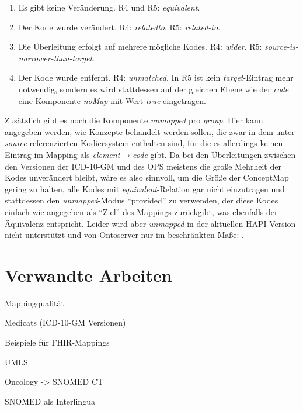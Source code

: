 \begin{enumerate}
\item Es gibt keine Veränderung. R4 und R5: \emph{equivalent}.
\item Der Kode wurde verändert. R4: \emph{relatedto}. R5: \emph{related-to}.
\item Die Überleitung erfolgt auf mehrere mögliche Kodes. R4: \emph{wider}. \newline R5: \emph{source-is-narrower-than-target}.
\item Der Kode wurde entfernt. R4: \emph{unmatched}. \newline In R5 ist kein \emph{target}-Eintrag mehr notwendig, sondern es wird stattdessen auf der gleichen Ebene wie der \emph{code} eine Komponente \emph{noMap} mit Wert \emph{true} eingetragen. 
\end{enumerate}

Zusätzlich gibt es noch die Komponente \emph{unmapped} pro \emph{group}. Hier kann angegeben werden, wie Konzepte behandelt werden sollen, die zwar in dem unter \emph{source} referenzierten Kodiersystem enthalten sind, für die es allerdings keinen Eintrag im Mapping als \emph{element$\rightarrow$code} gibt. Da bei den Überleitungen zwischen den Versionen der ICD-10-GM und des OPS meistens die große Mehrheit der Kodes unverändert bleibt, wäre es also sinnvoll, um die Größe der ConceptMap gering zu halten, alle Kodes mit \emph{equivalent}-Relation gar nicht einzutragen und stattdessen den \emph{unmapped}-Modus "`provided"' zu verwenden, der diese Kodes einfach wie angegeben als "`Ziel"' des Mappings zurückgibt, was ebenfalls der Äquivalenz entspricht. Leider wird aber \emph{unmapped} in der aktuellen HAPI-Version nicht unterstützt und von Ontoserver nur im beschränkten Maße: \cite{fhir-unmapped}.

\section{Verwandte Arbeiten}

Mappingqualität

Medicats (ICD-10-GM Versionen)

Beispiele für FHIR-Mappings

UMLS

Oncology -> SNOMED CT

SNOMED als Interlingua






